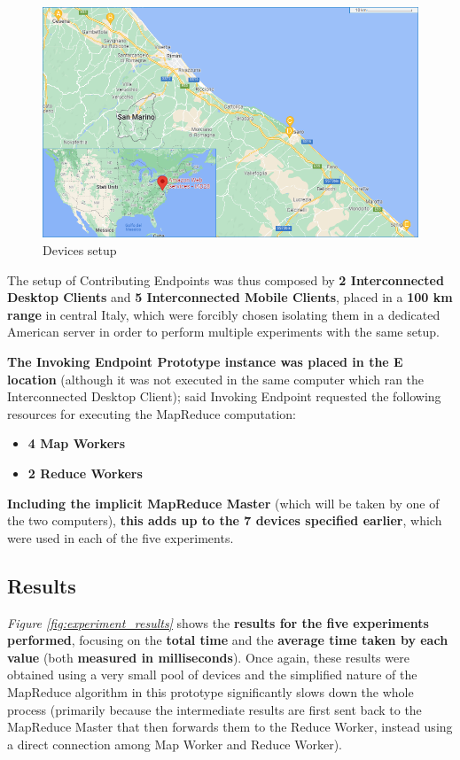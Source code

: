 \begin{figure}[!ht]
    \centering
    \includegraphics[width=\linewidth]{document/chapters/chapter_7/images/experiment_devices_setup.png}
    \caption{Devices setup}
    \label{fig:experiment_devices_setup}
\end{figure}

The setup of Contributing Endpoints was thus composed by \textbf{2 Interconnected Desktop Clients} and \textbf{5 Interconnected Mobile Clients}, placed in a \textbf{100 km range} in central Italy, which were forcibly chosen isolating them in a dedicated American server in order to perform multiple experiments with the same setup.

\textbf{The Invoking Endpoint Prototype instance was placed in the E location} (although it was not executed in the same computer which ran the Interconnected Desktop Client); said Invoking Endpoint requested the following resources for executing the MapReduce computation:
\begin{itemize}
    \item \textbf{4 Map Workers}
    \item \textbf{2 Reduce Workers}
\end{itemize}
    \textbf{Including the implicit MapReduce Master} (which will be taken by one of the two computers), \textbf{this adds up to the 7 devices specified earlier}, which were used in each of the five experiments.

\subsection{Results}
\textit{Figure \ref{fig:experiment_results}} shows the \textbf{results for the five experiments performed}, focusing on the \textbf{total time} and the \textbf{average time taken by each value} (both \textbf{measured in milliseconds}). Once again, these results were obtained using a very small pool of devices and the simplified nature of the MapReduce algorithm in this prototype significantly slows down the whole process (primarily because the intermediate results are first sent back to the MapReduce Master that then forwards them to the Reduce Worker, instead using a direct connection among Map Worker and Reduce Worker).

